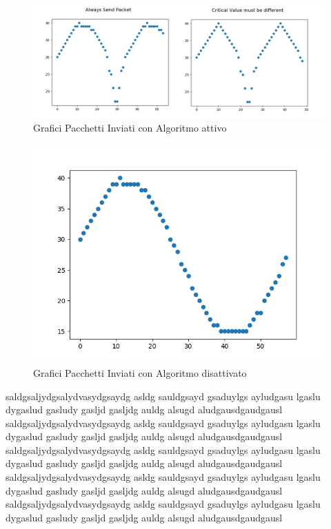       \begin{center}
        \begin{figure}
          \centering
          \includegraphics[width=\linewidth]{../Immagini/MergeOn.png}
          \caption{Grafici Pacchetti Inviati con Algoritmo attivo}
          \label{fig:mergeOn}
        \end{figure}

        \begin{figure}
          \centering
          \includegraphics[width=\linewidth]{../Immagini/OFF.png}
          \caption{Grafici Pacchetti Inviati con Algoritmo disattivato}
          \label{fig:off}
        \end{figure}
      \end{center}

      saldgsaljydgsalydvasydgsaydg asldg sauldgsayd gsaduylgs ayludgasu lgaslu dygaslud gasludy gasljd gasljdg auldg alsugd aludgausdgaudgausl
      saldgsaljydgsalydvasydgsaydg asldg sauldgsayd gsaduylgs ayludgasu lgaslu dygaslud gasludy gasljd gasljdg auldg alsugd aludgausdgaudgausl
      saldgsaljydgsalydvasydgsaydg asldg sauldgsayd gsaduylgs ayludgasu lgaslu dygaslud gasludy gasljd gasljdg auldg alsugd aludgausdgaudgausl
      saldgsaljydgsalydvasydgsaydg asldg sauldgsayd gsaduylgs ayludgasu lgaslu dygaslud gasludy gasljd gasljdg auldg alsugd aludgausdgaudgausl
      saldgsaljydgsalydvasydgsaydg asldg sauldgsayd gsaduylgs ayludgasu lgaslu dygaslud gasludy gasljd gasljdg auldg alsugd aludgausdgaudgausl





